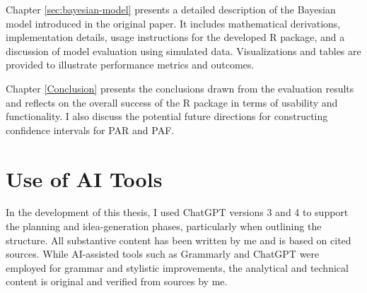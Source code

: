 Chapter \ref{sec:bayesian-model} presents a detailed description of the Bayesian model introduced in the original paper. It includes mathematical derivations, implementation details, usage instructions for the developed R package, and a discussion of model evaluation using simulated data. Visualizations and tables are provided to illustrate performance metrics and outcomes.

Chapter \ref{Conclusion} presents the conclusions drawn from the evaluation results and reflects on the overall success of the R package in terms of usability and functionality. I also discuss the potential future directions for constructing confidence intervals for PAR and PAF.

\section{Use of AI Tools} \label{sec:AI}

In the development of this thesis, I used ChatGPT versions 3 and 4 to support the planning and idea-generation phases, particularly when outlining the structure. All substantive content has been written by me and is based on cited sources. While AI-assisted tools such as Grammarly and ChatGPT were employed for grammar and stylistic improvements, the analytical and technical content is original and verified from sources by me.
